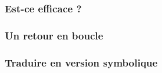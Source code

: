 \subsubsection{Est-ce efficace ?}
	


\subsubsection{Un retour en boucle}
	   
	

\subsubsection{Traduire en version symbolique}
	   
